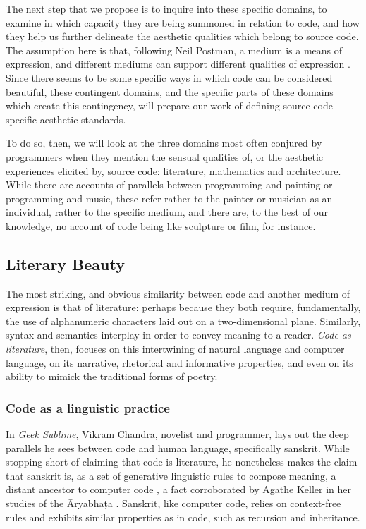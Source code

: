 The next step that we propose is to inquire into these specific domains, to examine in which capacity they are being summoned in relation to code, and how they help us further delineate the aesthetic qualities which belong to source code. The assumption here is that, following Neil Postman, a medium is a means of expression, and different mediums can support different qualities of expression \citep{postman_amusing_1985}. Since there seems to be some specific ways in which code can be considered beautiful, these contingent domains, and the specific parts of these domains which create this contingency, will prepare our work of defining source code-specific aesthetic standards.

To do so, then, we will look at the three domains most often conjured by programmers when they mention the sensual qualities of, or the aesthetic experiences elicited by, source code: literature, mathematics and architecture. While there are accounts of parallels between programming and painting \citep{graham_hackers_2003} or programming and music\citep{mclean_hacking_2004}, these refer rather to the painter or musician as an individual, rather to the specific medium, and there are, to the best of our knowledge, no account of code being like sculpture or film, for instance.

\subsection{Literary Beauty}

The most striking, and obvious similarity between code and another medium of expression is that of literature: perhaps because they both require, fundamentally, the use of alphanumeric characters laid out on a two-dimensional plane. Similarly, syntax and semantics interplay in order to convey meaning to a reader. \emph{Code as literature}, then, focuses on this intertwining of natural language and computer language, on its narrative, rhetorical and informative properties, and even on its ability to mimick the traditional forms of poetry.

\subsubsection{Code as a linguistic practice}

In \emph{Geek Sublime}, Vikram Chandra, novelist and programmer, lays out the deep parallels he sees between code and human language, specifically sanskrit. While stopping short of claiming that code is literature, he nonetheless makes the claim that sanskrit is, as a set of generative linguistic rules to compose meaning, a distant ancestor to computer code \citep{chandra_geek_2014}, a fact corroborated by Agathe Keller in her studies of the Āryabhaṭa \citep{keller_textes_2021}. Sanskrit, like computer code, relies on context-free rules and exhibits similar properties as in code, such as recursion and inheritance.

